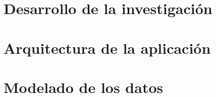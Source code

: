 \chapter{Desarrollo de la investigación}

\chapter{Arquitectura de la aplicación}

\chapter{Modelado de los datos}
